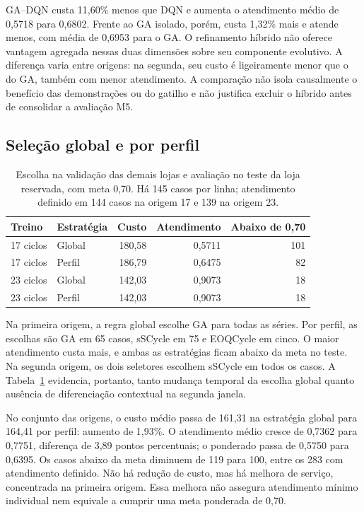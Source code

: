 GA--DQN custa 11,60\% menos que DQN e aumenta o atendimento médio de 0,5718 para 0,6802. Frente ao GA isolado, porém, custa 1,32\% mais e atende menos, com média de 0,6953 para o GA. O refinamento híbrido não oferece vantagem agregada nessas duas dimensões sobre seu componente evolutivo. A diferença varia entre origens: na segunda, seu custo é ligeiramente menor que o do GA, também com menor atendimento. A comparação não isola causalmente o benefício das demonstrações ou do gatilho e não justifica excluir o híbrido antes de consolidar a avaliação M5.

\subsection{Seleção global e por perfil}

\begin{table}[htbp]
\centering\small
\caption{Escolha na validação das demais lojas e avaliação no teste da loja reservada, com meta 0,70. Há 145 casos por linha; atendimento definido em 144 casos na origem 17 e 139 na origem 23.}
\label{tab:ba2026_selection}
\begin{tabular}{@{}llrrr@{}}\toprule
Treino & Estratégia & Custo & Atendimento & Abaixo de 0,70\\\midrule
17 ciclos & Global &180,58&0,5711&101\\
17 ciclos & Perfil &186,79&0,6475&82\\
23 ciclos & Global &142,03&0,9073&18\\
23 ciclos & Perfil &142,03&0,9073&18\\
\bottomrule\end{tabular}
\end{table}

Na primeira origem, a regra global escolhe GA para todas as séries. Por perfil, as escolhas são GA em 65 casos, sSCycle em 75 e EOQCycle em cinco. O maior atendimento custa mais, e ambas as estratégias ficam abaixo da meta no teste. Na segunda origem, os dois seletores escolhem sSCycle em todos os casos. A Tabela~\ref{tab:ba2026_selection} evidencia, portanto, tanto mudança temporal da escolha global quanto ausência de diferenciação contextual na segunda janela.

No conjunto das origens, o custo médio passa de 161,31 na estratégia global para 164,41 por perfil: aumento de 1,93\%. O atendimento médio cresce de 0,7362 para 0,7751, diferença de 3,89 pontos percentuais; o ponderado passa de 0,5750 para 0,6395. Os casos abaixo da meta diminuem de 119 para 100, entre os 283 com atendimento definido. Não há redução de custo, mas há melhora de serviço, concentrada na primeira origem. Essa melhora não assegura atendimento mínimo individual nem equivale a cumprir uma meta ponderada de 0,70.

